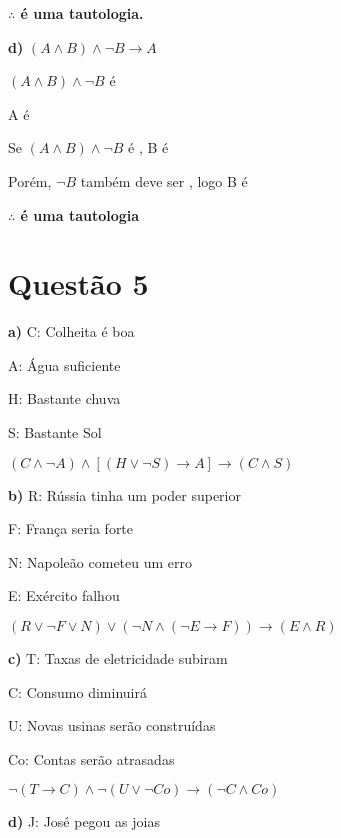 \medskip
\noindent
\dotfill
\medskip

\noindent
\textbf{$\therefore$ é uma tautologia.}

\bigskip
\noindent
\textbf{d)} $(A \wedge B) \wedge \neg B \rightarrow A$

\medskip
\noindent
$(A \wedge B) \wedge \neg B$ é \vv

\noindent
A é \ff

\medskip
\noindent
\dotfill
\medskip

\noindent
Se $(A \wedge B) \wedge \neg B$ é \vv, B é \vv

\noindent
Porém, $\neg B$ também deve ser \vv, logo B é \ff

\noindent
\textbf{$\therefore$ é uma tautologia}

\section*{Questão 5}
\bigskip
\noindent
\textbf{a)}
C: Colheita é boa

A: Água suficiente

H: Bastante chuva

S: Bastante Sol

\medskip
$(C \wedge \neg A) \wedge [(H \vee \neg S) \rightarrow A] \rightarrow (C \wedge S)$

\bigskip
\noindent
\textbf{b)}
R: Rússia tinha um poder superior

F: França seria forte

N: Napoleão cometeu um erro

E: Exército falhou

\medskip
$(R \vee \neg F \vee N) \vee (\neg N \wedge (\neg E \rightarrow F)) \rightarrow (E \wedge R)$

\bigskip
\noindent
\textbf{c)}
T: Taxas de eletricidade subiram

C: Consumo diminuirá

U: Novas usinas serão construídas

Co: Contas serão atrasadas

\medskip
$\neg (T \rightarrow C) \wedge \neg (U \vee \neg Co) \rightarrow (\neg C \wedge Co)$

\bigskip
\noindent
\textbf{d)}
J: José pegou as joias

